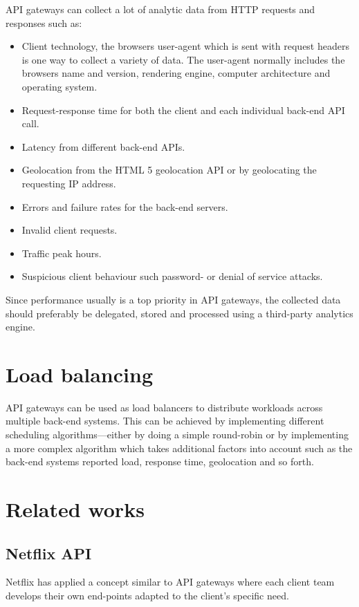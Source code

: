 \documentclass{cslthse-msc}
\begin{document}
\vspace{5mm}

\noindent API gateways can collect a lot of analytic data from HTTP requests and responses such as:
\begin{itemize}
	\item Client technology, the browsers user-agent which is sent with request headers is one way to collect a variety of data. The user-agent normally includes the browsers name and version, rendering engine, computer architecture and operating system.
	\item Request-response time for both the client and each individual back-end API call.
	\item Latency from different back-end APIs.
	\item Geolocation from the HTML 5 geolocation API\cite{html5_geolocation} or by geolocating the requesting IP address.
	\item Errors and failure rates for the back-end servers.
	\item Invalid client requests.
	\item Traffic peak hours.
	\item Suspicious client behaviour such password- or denial of service attacks.
\end{itemize}

\noindent Since performance usually is a top priority in API gateways, the collected data should preferably be delegated, stored and processed using a third-party analytics engine.

\section{Load balancing}
API gateways can be used as load balancers to distribute workloads across multiple back-end systems. This can be achieved by implementing different scheduling algorithms---either by doing a simple round-robin or by implementing a more complex algorithm which takes additional factors into account such as the back-end systems reported load, response time, geolocation and so forth.

\section{Related works}

\subsection{Netflix API}
Netflix has applied a concept similar to API gateways where each client team develops their own end-points adapted to the client's specific need.
\end{document}
